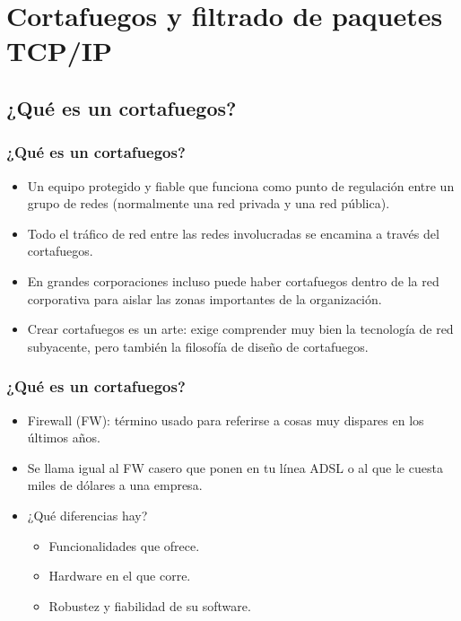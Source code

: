 \documentclass{beamer}
\begin{document}
\section{Cortafuegos y filtrado de paquetes TCP/IP}

\subsection{¿Qué es un cortafuegos?}

\begin{frame}
\frametitle{¿Qué es un cortafuegos?}

\begin{itemize}
\item Un equipo protegido y fiable que funciona como punto de regulación entre un grupo de redes (normalmente una red privada y una red pública).
\item Todo el tráfico de red entre las redes involucradas se encamina a través del cortafuegos.
\item En grandes corporaciones incluso puede haber cortafuegos dentro de la red corporativa para aislar las zonas importantes de la organización.
\item Crear cortafuegos es un arte: exige comprender muy bien la tecnología de red subyacente, pero también la filosofía de diseño de cortafuegos.
\end{itemize}

\end{frame}



\begin{frame}
\frametitle{¿Qué es un cortafuegos?}

\begin{itemize}
\item Firewall (FW): término usado para referirse a cosas muy dispares en los últimos años.
\item Se llama igual al FW casero que ponen en tu línea ADSL o al que le cuesta miles de dólares a una empresa.
\item ¿Qué diferencias hay?

	\begin{itemize}
	\item Funcionalidades que ofrece.
	\item Hardware en el que corre.
	\item Robustez y fiabilidad de su software.
	\end{itemize}

\end{itemize}
\end{frame}
\end{document}
